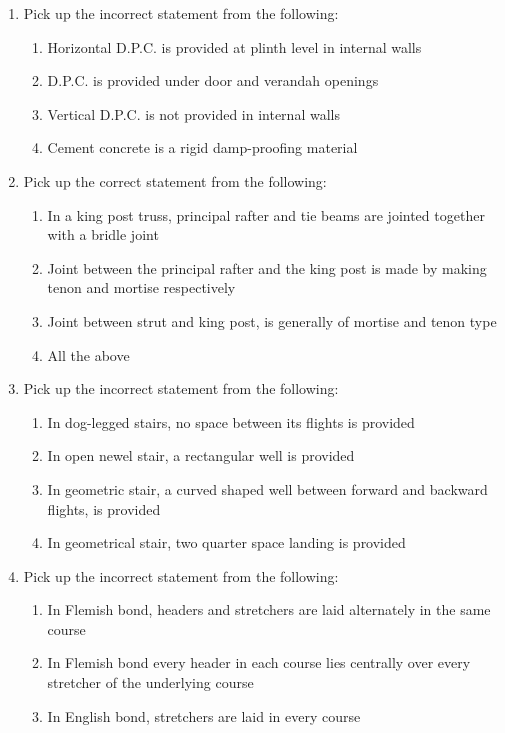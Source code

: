 \documentclass[11pt,a4paper]{article}
\begin{document}
\begin{enumerate}
\begin{enumerate}[label=\Alph*.]
\end{enumerate}
\item{Pick up the incorrect statement from the following:}
\begin{enumerate}[label=\Alph*.]
\item{Horizontal D.P.C. is provided at plinth level in internal walls}
\item{D.P.C. is provided under door and verandah openings}
\item{Vertical D.P.C. is not provided in internal walls}
\item{Cement concrete is a rigid damp-proofing material}
\end{enumerate}
\item{Pick up the correct statement from the following:}
\begin{enumerate}[label=\Alph*.]
\item{In a king post truss, principal rafter and tie beams are jointed together with a bridle joint}
\item{Joint between the principal rafter and the king post is made by making tenon and mortise respectively}
\item{Joint between strut and king post, is generally of mortise and tenon type}
\item{All the above}
\end{enumerate}
\item{Pick up the incorrect statement from the following:}
\begin{enumerate}[label=\Alph*.]
\item{In dog-legged stairs, no space between its flights is provided}
\item{In open newel stair, a rectangular well is provided}
\item{In geometric stair, a curved shaped well between forward and backward flights, is provided}
\item{In geometrical stair, two quarter space landing is provided}
\end{enumerate}
\item{Pick up the incorrect statement from the following:}
\begin{enumerate}[label=\Alph*.]
\item{In Flemish bond, headers and stretchers are laid alternately in the same course}
\item{In Flemish bond every header in each course lies centrally over every stretcher of the underlying course}
\item{In English bond, stretchers are laid in every course}

\end{enumerate}
\end{enumerate}
\end{document}
